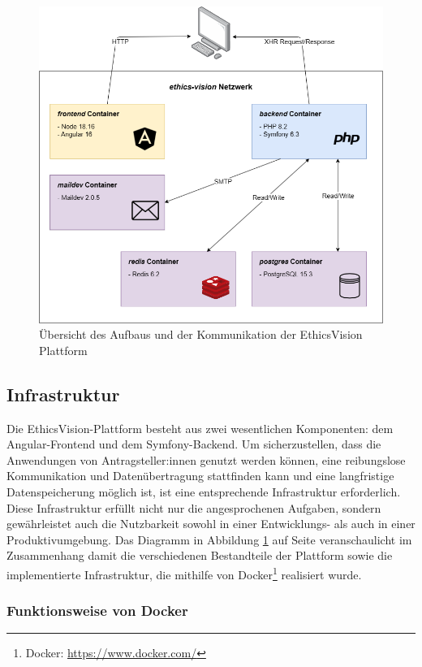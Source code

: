 \documentclass[a4paper,12pt,twoside]{scrreprt}
\begin{document}
\begin{figure}[ht]
    \centering
    \includegraphics[width=.84\linewidth]{thesis/images/Luidold_EthicsVision-Diagramm.png}
    \caption{Übersicht des Aufbaus und der Kommunikation der EthicsVision Plattform}
    \label{fig:ethics-vision-diagramm}
\end{figure}

\subsection{Infrastruktur}
\label{sub-sec:ausarbeitung-infrastruktur}

Die EthicsVision-Plattform besteht aus zwei wesentlichen Komponenten: dem Angular-Frontend und dem Symfony-Backend.  Um sicherzustellen, dass die Anwendungen von Antragsteller:innen genutzt werden können, eine reibungslose Kommunikation und Datenübertragung stattfinden kann und eine langfristige Datenspeicherung möglich ist, ist eine entsprechende Infrastruktur erforderlich. Diese Infrastruktur erfüllt nicht nur die angesprochenen Aufgaben, sondern gewährleistet auch die Nutzbarkeit sowohl in einer Entwicklungs- als auch in einer Produktivumgebung. Das Diagramm in Abbildung \ref{fig:ethics-vision-diagramm} auf Seite \pageref{fig:ethics-vision-diagramm} veranschaulicht im Zusammenhang damit die verschiedenen Bestandteile der Plattform sowie die implementierte Infrastruktur, die mithilfe von Docker\footnote{Docker: \url{https://www.docker.com/}} realisiert wurde.

\subsubsection*{Funktionsweise von Docker}
\label{funktionsweise-docker}
\end{document}
